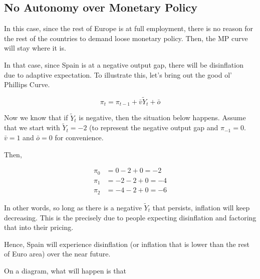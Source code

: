 \documentclass[11pt]{scrartcl}
\newcommand{\og}{\ensuremath{\tilde{Y}}}
\begin{document}
\subsection{No Autonomy over Monetary Policy}

In this case, since the rest of Europe is at full employment, there is no reason for the rest of the countries to demand loose monetary policy. Then, the MP curve will stay where it is.

In that case, since Spain is at a negative output gap, there will be disinflation due to adaptive expectation. To illustrate this, let's bring out the good ol' Phillips Curve.

\[ \pi_t = \pi_{t-1} + \bar{v} \og_t + \bar{o} \] 

Now we know that if $\og_t$ is negative, then the situation below happens. Assume that we start with $\og_t = -2$ (to represent the negative output gap and $\pi_{-1} = 0$. $\bar{v} = 1$ and $\bar{o} = 0$ for convenience.

Then,

\begin{align*}
\pi_0 &= 0 - 2 + 0 = -2 \\ 
\pi_1 &= -2 - 2 + 0 = -4 \\ 
\pi_2 &= -4 - 2 + 0 = -6
\end{align*}

In other words, so long as there is a negative $\og_t$ that persists, inflation will keep decreasing. This is the precisely due to people expecting disinflation and factoring that into their pricing.

Hence, Spain will experience disinflation (or inflation that is lower than the rest of Euro area) over the near future.

On a diagram, what will happen is that
\end{document}
